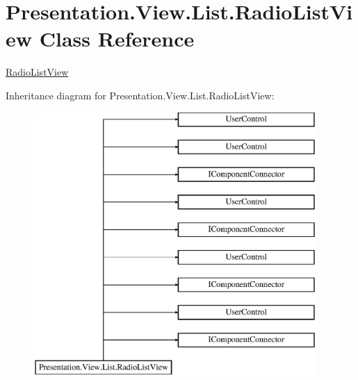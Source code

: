 \hypertarget{class_presentation_1_1_view_1_1_list_1_1_radio_list_view}{}\section{Presentation.\+View.\+List.\+Radio\+List\+View Class Reference}
\label{class_presentation_1_1_view_1_1_list_1_1_radio_list_view}


\hyperlink{class_presentation_1_1_view_1_1_list_1_1_radio_list_view}{Radio\+List\+View}  


Inheritance diagram for Presentation.\+View.\+List.\+Radio\+List\+View\+:\begin{figure}[H]
\begin{center}
\leavevmode
\includegraphics[height=10.000000cm]{class_presentation_1_1_view_1_1_list_1_1_radio_list_view}
\end{center}
\end{figure}
